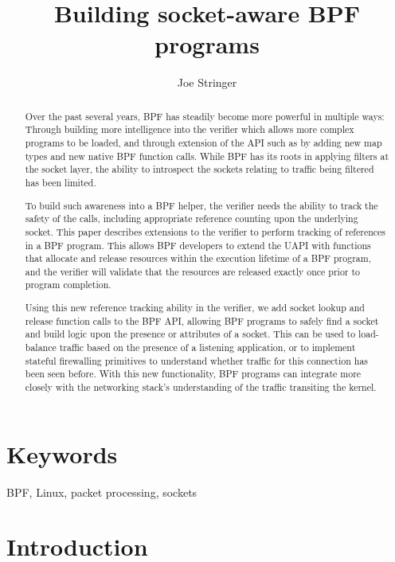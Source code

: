 \documentclass[10pt,sigconf,authorversion]{lpc}
\title{Building socket-aware BPF programs}
\author{Joe Stringer}
\affiliation{%
      \institution{Cilium.io}}
\begin{document}
\begin{abstract}

    Over the past several years, BPF has steadily become more powerful in
    multiple ways: Through building more intelligence into the verifier which
    allows more complex programs to be loaded, and through extension of the API
    such as by adding new map types and new native BPF function calls. While
    BPF has its roots in applying filters at the socket layer, the ability to
    introspect the sockets relating to traffic being filtered has been limited.

    To build such awareness into a BPF helper, the verifier needs the ability
    to track the safety of the calls, including appropriate reference counting
    upon the underlying socket. This paper describes extensions to the verifier
    to perform tracking of references in a BPF program. This allows BPF
    developers to extend the UAPI with functions that allocate and release
    resources within the execution lifetime of a BPF program, and the verifier
    will validate that the resources are released exactly once prior to program
    completion.

    Using this new reference tracking ability in the verifier, we add socket
    lookup and release function calls to the BPF API, allowing BPF programs to
    safely find a socket and build logic upon the presence or attributes of a
    socket. This can be used to load-balance traffic based on the presence of a
    listening application, or to implement stateful firewalling primitives to
    understand whether traffic for this connection has been seen before. With
    this new functionality, BPF programs can integrate more closely with the
    networking stack's understanding of the traffic transiting the kernel.

\end{abstract}

\maketitle

\section{Keywords}

BPF, Linux, packet processing, sockets

\section{Introduction}
\end{document}
